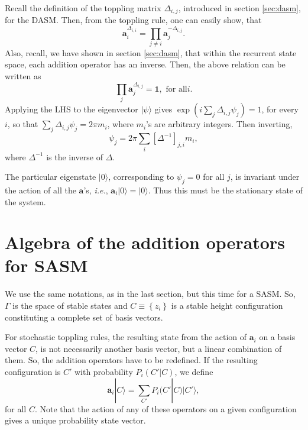 \documentclass[11pt,a4paper]{book}
\begin{document}
Recall the definition of the toppling matrix $\Delta_{i,j}$,
introduced in section \ref{sec:dasm}, for the DASM. Then, from the toppling
rule, one can easily show, that
\begin{equation}
\mathbf{a}_{i}^{\Delta_{i,i}}=\prod_{j\ne
i}\mathbf{a}_{j}^{-\Delta_{i,j}}.
\label{eq:dasmalgbr}
\end{equation}
Also, recall, we have shown in section \ref{sec:dasm}, that within the
recurrent state space, each addition operator has an inverse. Then,
the above relation can be written as
\begin{equation}
\prod_{j}\mathbf{a}_{j}^{\Delta_{i,j}}=\mathbf{1}, \textrm{  for all
}i.
\end{equation}
Applying the LHS to the eigenvector $|\psi\rangle$ gives $\exp\left(
i\sum_{j}\Delta_{i,j}\psi_{j} \right)=1$, for every $i$, so that
$\sum_{j}\Delta_{i,j}\psi_{j}=2\pi m_{i}$, where $m_{i}$'s are
arbitrary integers. Then inverting,
\begin{equation}
\psi_{j}=2\pi\sum_{i}\left[\Delta^{-1}\right]_{j,i}m_{i},
\end{equation}
where $\Delta^{-1}$ is the inverse of $\Delta$.

The particular eigenstate $|0\rangle$, corresponding to
$\psi_{j}=0$ for all $j$, is invariant under the action of all the
$\mathbf{a}$'s, \textit{i.e.}, $\mathbf{a}_{i}|0\rangle=|0\rangle$.
Thus this must be the stationary state of the system.

\section{Algebra of the addition operators for SASM}\label{sec:ch5.3}
We use the same notations, as in the last section, but this time for
a SASM. So, $\Gamma$ is the space of stable states and
$C\equiv\left\{ z_{i} \right\}$ is a stable height configuration
constituting a complete set of basis vectors.

For stochastic toppling rules, the 
resulting state from the action of $\mathbf{a}_{i}$ on a basis vector
$C$, is not necessarily another basis vector, but a linear combination of
them. So, the addition operators have to be redefined. If the resulting configuration is $C'$
with probability $P_i(C'|C)$, we define
\begin{equation}
  \mathbf{a}_i|C\rangle = \sum_{C'} P_i(C'|C) |C'\rangle,
  \label{a_i}
\end{equation}
for all $C$. Note that the action of any of these operators on a given
configuration gives a unique probability state vector. 
\end{document}
